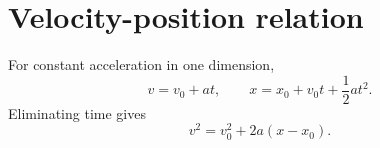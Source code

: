 %
%
%
%

\section*{Velocity-position relation}
For constant acceleration in one dimension,
\[
  v=v_0+at,\qquad x=x_0+v_0t+\frac{1}{2}at^2.
\]
Eliminating time gives
\[
  v^2=v_0^2+2a(x-x_0).
\]
